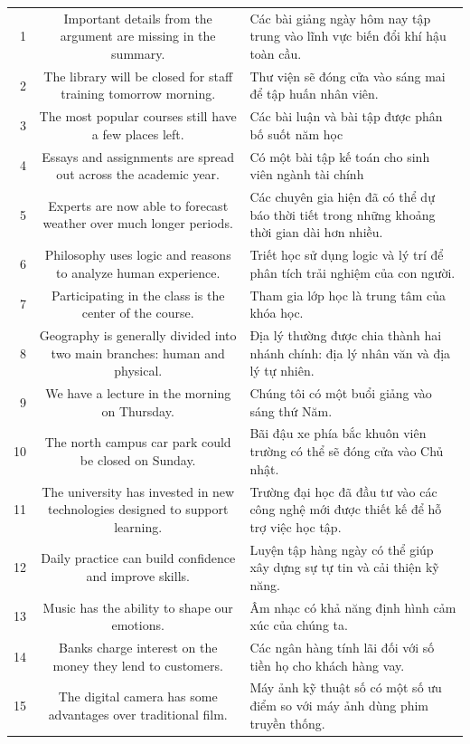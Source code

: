 \documentclass[11pt,a4paper]{article}
\begin{document}
\begin{longtable}{N S M}
1 & Important details from the argument are missing in the summary. & Các bài giảng ngày hôm nay tập trung vào lĩnh vực biến đổi khí hậu toàn cầu. \\
2 & The library will be closed for staff training tomorrow morning. & Thư viện sẽ đóng cửa vào sáng mai để tập huấn nhân viên. \\
3 & The most popular courses still have a few places left. & Các bài luận và bài tập được phân bố suốt năm học \\
4 & Essays and assignments are spread out across the academic year. & Có một bài tập kế toán cho sinh viên ngành tài chính \\
5 & Experts are now able to forecast weather over much longer periods. & Các chuyên gia hiện đã có thể dự báo thời tiết trong những khoảng thời gian dài hơn nhiều. \\
6 & Philosophy uses logic and reasons to analyze human experience. & Triết học sử dụng logic và lý trí để phân tích trải nghiệm của con người. \\
7 & Participating in the class is the center of the course. & Tham gia lớp học là trung tâm của khóa học. \\
8 & Geography is generally divided into two main branches: human and physical. & Địa lý thường được chia thành hai nhánh chính: địa lý nhân văn và địa lý tự nhiên. \\
9 & We have a lecture in the morning on Thursday. & Chúng tôi có một buổi giảng vào sáng thứ Năm. \\
10 & The north campus car park could be closed on Sunday. & Bãi đậu xe phía bắc khuôn viên trường có thể sẽ đóng cửa vào Chủ nhật. \\
11 & The university has invested in new technologies designed to support learning. & Trường đại học đã đầu tư vào các công nghệ mới được thiết kế để hỗ trợ việc học tập. \\
12 & Daily practice can build confidence and improve skills. & Luyện tập hàng ngày có thể giúp xây dựng sự tự tin và cải thiện kỹ năng. \\
13 & Music has the ability to shape our emotions. & Âm nhạc có khả năng định hình cảm xúc của chúng ta. \\
14 & Banks charge interest on the money they lend to customers. & Các ngân hàng tính lãi đối với số tiền họ cho khách hàng vay. \\
15 & The digital camera has some advantages over traditional film. & Máy ảnh kỹ thuật số có một số ưu điểm so với máy ảnh dùng phim truyền thống. \\

\end{longtable}
\end{document}
